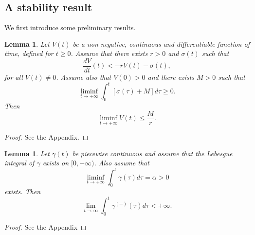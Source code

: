\documentclass[letterpaper,10pt,conference,twocolumn]{IEEEtran}
\newtheorem{lem}[thm]{Lemma}
\begin{document}
\subsection{A stability result}
We first introduce some preliminary results.
\begin{lem}\label{lem:lyapliminf}
	Let $V(t)$ be a non-negative, continuous and differentiable function of time,
	defined for $t\geq 0$.
	Assume that there exists $r>0$ and $\sigma(t)$ such that
	\begin{equation}\label{eq:diffV_lem_liminf}
		\frac{dV}{dt}(t)<-r V(t)-\sigma(t),
	\end{equation}
	for all $V(t)\neq 0$.
	Assume also that $V(0)>0$ and there exists $M>0$ such that
	\begin{equation*}
		\liminf_{t\rightarrow +\infty} \int_0^{t}[\sigma(\tau)+M]d\tau\geq 0.
	\end{equation*}
	Then 
	\begin{equation*}
		\liminf_{t\rightarrow +\infty} V(t)\leq \frac{M}{r}.
	\end{equation*}
\end{lem}
\begin{proof}
	See the Appendix.
\end{proof}
\begin{lem}\label{lem:conv_sigma^(-)}
	Let $\gamma(t)$ be piecewise continuous and assume that
	the Lebesgue integral of $\gamma$ exists on $[0,+\infty)$. Also assume that
	\begin{equation}\label{eq:liminfpositive}
		\liminf_{t\rightarrow +\infty}\int_0^t \gamma(\tau) d\tau=\alpha>0
	\end{equation}
	exists.
	Then
	\begin{equation*}
		\lim_{t\rightarrow\infty}\int_0^{t}\gamma^{(-)}(\tau)d\tau<+\infty.
	\end{equation*}
\end{lem}
\begin{proof} See the Appendix
\end{proof}
\end{document}
